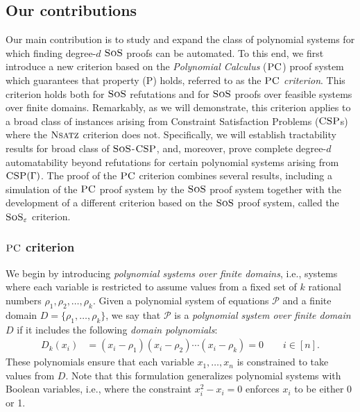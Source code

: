 \documentclass[11pt]{article}
\newcommand{\sos}{\text{\sc{SoS}}}
\newcommand{\CSP}{\textsc{CSP}}
\newcommand{\PC}{\textsc{PC}}
\newcommand{\Nsatz}{\textsc{Nsatz}}
\newcommand{\1}{\textbf{1}}
\begin{document}
\subsection{Our contributions}\label{sect:contribution}


Our main contribution is to study and expand the class of polynomial systems for which finding degree-$d$ \(\sos\) proofs can be automated. To this end, we first introduce a new criterion based on the \textit{Polynomial Calculus} ($\PC$) proof system which guarantees that property (\textsc{P}) holds, referred to as the \textit{$\PC$ criterion}. This criterion holds both for $\sos$ refutations and for $\sos$ proofs over feasible systems over finite domains. Remarkably, as we will demonstrate, this criterion applies to a broad class of instances arising from Constraint Satisfaction Problems ($\CSP$s) where the $\Nsatz$ criterion does not. Specifically, we will establish tractability results for broad class of $\sos$-$\CSP$, and, moreover, prove complete degree-$d$ automatability beyond refutations for certain polynomial systems arising from $\CSP(\Gamma)$. The proof of the $\PC$ criterion combines several results, including a simulation of the $\PC$ proof system by the $\sos$  proof system together with the development of a different criterion based on the $\sos$ proof system, called the \(\sos_{\varepsilon}\) criterion.

\subsubsection*{$\PC$ criterion} \label{sect:PC-crit}
We begin by introducing \textit{polynomial systems over finite domains}, i.e., systems where each variable is restricted to assume values from a fixed set of $k$ rational numbers $ \rho_{1}, \rho_{2}, \ldots, \rho_{k} $. Given a polynomial system of equations $\mathcal{P}$ and a finite domain $D = \{\rho_1, \ldots, \rho_{k}\}$, we say that $\mathcal{P}$ is a \emph{polynomial system over finite domain $D$} if it includes the following \textit{domain polynomials}:
\begin{align}
D_{k}(x_i)&=(x_i-\rho_{1})(x_i-\rho_{2})\cdots (x_i-\rho_{k}) = 0\qquad i\in[n].
\end{align}
These polynomials ensure that each variable $x_1, \ldots, x_n$ is constrained to take values from $D$. Note that this formulation generalizes polynomial systems with Boolean variables, i.e., where the constraint \( x_i^2 - x_i = 0 \) enforces $x_i$ to be either 0 or 1.
\end{document}
